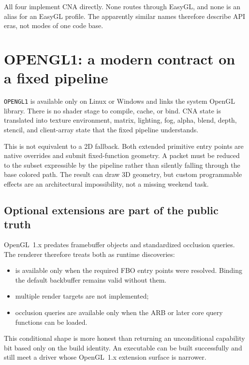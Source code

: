 All four implement CNA directly. None routes through EasyGL, and none is an alias for an
EasyGL profile.  The apparently similar names therefore describe API eras, not modes of one
code base.

\section{OPENGL1: a modern contract on a fixed pipeline}

\texttt{OPENGL1} is available only on Linux or Windows and links the system OpenGL library.
There is no shader stage to compile, cache, or bind.  CNA state is translated into texture
environment, matrix, lighting, fog, alpha, blend, depth, stencil, and client-array state that
the fixed pipeline understands.

This is not equivalent to a 2D fallback.  Both extended primitive entry points are native
overrides and submit fixed-function geometry.  A  packet must be
reduced to the subset expressible by the pipeline rather than silently falling through the
base colored path.  The result can draw 3D geometry, but custom programmable effects are an
architectural impossibility, not a missing weekend task.

\subsection{Optional extensions are part of the public truth}

OpenGL~1.x predates framebuffer objects and standardized occlusion queries.  The renderer
therefore treats both as runtime discoveries:

\begin{itemize}
  \item {} is available only when the required FBO entry points were
        resolved.  Binding the default backbuffer remains valid without them.
  \item multiple render targets are not implemented;
  \item occlusion queries are available only when the ARB or later core query functions can
        be loaded.
\end{itemize}

This conditional shape is more honest than returning an unconditional capability bit based
only on the build identity.  An executable can be built successfully and still meet a
driver whose OpenGL~1.x extension surface is narrower.

